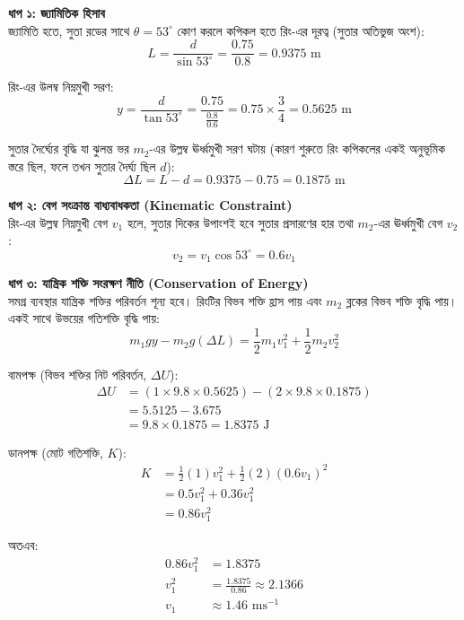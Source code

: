 \documentclass[12pt, a4paper]{article}
\begin{document}
\begin{tcolorbox}[solutionbox={সমাধান (Solution)}]
    \noindent
    \textbf{ধাপ ১: জ্যামিতিক হিসাব} \\
    জ্যামিতি হতে, সুতা রডের সাথে $\theta = 53^\circ$ কোণ করলে কপিকল হতে রিং-এর দূরত্ব (সুতার অতিভুজ অংশ):
    \[ L = \frac{d}{\sin 53^\circ} = \frac{0.75}{0.8} = 0.9375\text{ m} \]
    
    রিং-এর উলম্ব নিম্নমুখী সরণ:
    \[ y = \frac{d}{\tan 53^\circ} = \frac{0.75}{\frac{0.8}{0.6}} = 0.75 \times \frac{3}{4} = 0.5625\text{ m} \]
    
    সুতার দৈর্ঘ্যের বৃদ্ধি যা ঝুলন্ত ভর $m_2$-এর উল্লম্ব ঊর্ধ্বমুখী সরণ ঘটায় (কারণ শুরুতে রিং কপিকলের একই অনুভূমিক স্তরে ছিল, ফলে তখন সুতার দৈর্ঘ্য ছিল $d$):
    \[ \Delta L = L - d = 0.9375 - 0.75 = 0.1875\text{ m} \]
    
    \vspace{0.5em}
    \noindent\textbf{ধাপ ২: বেগ সংক্রান্ত বাধ্যবাধকতা (Kinematic Constraint)} \\
    রিং-এর উল্লম্ব নিম্নমুখী বেগ $v_1$ হলে, সুতার দিকের উপাংশই হবে সুতার প্রসারণের হার তথা $m_2$-এর ঊর্ধ্বমুখী বেগ $v_2$:
    \[ v_2 = v_1 \cos 53^\circ = 0.6 v_1 \]
    
    \vspace{0.5em}
    \noindent\textbf{ধাপ ৩: যান্ত্রিক শক্তি সংরক্ষণ নীতি (Conservation of Energy)} \\
    সমগ্র ব্যবস্থার যান্ত্রিক শক্তির পরিবর্তন শূন্য হবে। রিংটির বিভব শক্তি হ্রাস পায় এবং $m_2$ ব্লকের বিভব শক্তি বৃদ্ধি পায়। একই সাথে উভয়ের গতিশক্তি বৃদ্ধি পায়:
    \[ m_1 g y - m_2 g (\Delta L) = \frac{1}{2} m_1 v_1^2 + \frac{1}{2} m_2 v_2^2 \]
    
    বামপক্ষ (বিভব শক্তির নিট পরিবর্তন, $\Delta U$):
    \begin{align*}
        \Delta U &= (1 \times 9.8 \times 0.5625) - (2 \times 9.8 \times 0.1875) \\
                 &= 5.5125 - 3.675 \\
                 &= 9.8 \times 0.1875 = 1.8375\text{ J}
    \end{align*}
    
    ডানপক্ষ (মোট গতিশক্তি, $K$):
    \begin{align*}
        K &= \frac{1}{2} (1) v_1^2 + \frac{1}{2} (2) (0.6 v_1)^2 \\
          &= 0.5 v_1^2 + 0.36 v_1^2 \\
          &= 0.86 v_1^2
    \end{align*}
    
    অতএব:
    \begin{align*}
        0.86 v_1^2 &= 1.8375 \\
        v_1^2 &= \frac{1.8375}{0.86} \approx 2.1366 \\
        v_1 &\approx \mathbf{1.46}\text{ ms}^{-1}
    \end{align*}
\end{tcolorbox}
\end{document}
